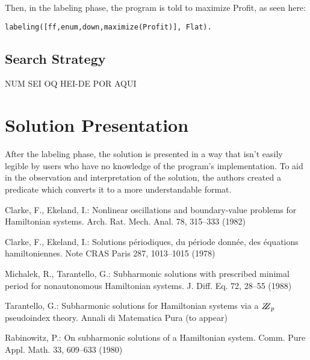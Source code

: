 \documentclass{llncs}
\begin{document}
Then, in the labeling phase, the program is told to maximize Profit, as seen here:

\begin{verbatim}
labeling([ff,enum,down,maximize(Profit)], Flat).
\end{verbatim}

\subsection{Search Strategy}
 NUM SEI OQ HEI-DE POR AQUI
 
 \section{Solution Presentation}
 After the labeling phase, the solution is presented in a way that isn't easily legible by users who have no knowledge of the program's implementation. To aid in the observation and interpretation of the solution, the authors created a predicate which converts it to a more understandable format.
 
 
 
%
%
\begin{thebibliography}{5}
%
Clarke, F., Ekeland, I.:
Nonlinear oscillations and
boundary-value problems for Hamiltonian systems.
Arch. Rat. Mech. Anal. 78, 315--333 (1982)

Clarke, F., Ekeland, I.:
Solutions p\'{e}riodiques, du
p\'{e}riode donn\'{e}e, des \'{e}quations hamiltoniennes.
Note CRAS Paris 287, 1013--1015 (1978)

Michalek, R., Tarantello, G.:
Subharmonic solutions with prescribed minimal
period for nonautonomous Hamiltonian systems.
J. Diff. Eq. 72, 28--55 (1988)

Tarantello, G.:
Subharmonic solutions for Hamiltonian
systems via a $\bbbz_{p}$ pseudoindex theory.
Annali di Matematica Pura (to appear)

Rabinowitz, P.:
On subharmonic solutions of a Hamiltonian system.
Comm. Pure Appl. Math. 33, 609--633 (1980)

\end{thebibliography}
\end{document}
